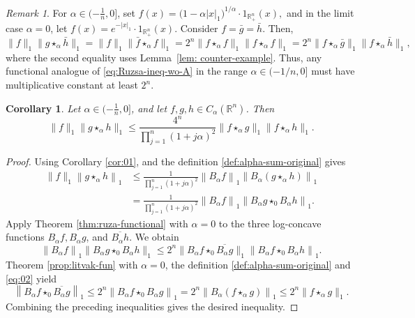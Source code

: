 \documentclass[11pt]{amsart}
\newcommand{\R}{{\mathbb R}}
\theoremstyle{plain}
\newtheorem{corollary}[theorem]{Corollary}
\theoremstyle{definition}
\theoremstyle{remark}
\newtheorem{remark}{Remark}
\begin{document}
\begin{remark}
For $\alpha\in(-\frac{1}{n},0]$, set $f(x)=\bigl(1-\alpha|x|_1\bigr)^{1/\alpha}\cdot {1}_{\mathbb{R}^n_+}(x),$
    and in the limit case $\alpha=0$, let
    \(
    f(x)=e^{-|x|_1} \cdot {1}_{\mathbb{R}^n_+}(x).
    \)
Consider  $f= \bar g = \bar h $. Then,
\[
\|f \|_1 \|g \star_\alpha \bar h\|_1 =\|f \|_1 \|\bar f \star_\alpha f \|_1 = 2^n \|f \star_\alpha f\|_1 \|f \star_\alpha f\|_1 = 2^n \|f \star_\alpha \bar g\|_1 \|f \star_\alpha \bar h\|_1,
\]
where the second equality uses Lemma~\ref{lem: counter-example}. Thus, any functional analogue of \eqref{eq:Ruzsa-ineq-wo-A} in the range \(\alpha\in(-1/n,0]\) must have multiplicative constant at least $2^n$.
\end{remark}


\begin{corollary} \label{cor:ruzvol1-func}
    Let $\alpha \in (-\frac{1}{n},0]$, and let $f,g,h  \in C_\alpha (\R^n)$. Then
    \[
        \|f\|_1 \|g \star_\alpha  h\|_1 \leq \frac{4^n}{\prod_{j=1}^n (1+j \alpha)^2} \|f \star_\alpha  g \|_1 \|f \star_\alpha  h \|_1.
    \]
\end{corollary}

\begin{proof}
    Using Corollary \ref{cor:01}, and the definition \eqref{def:alpha-sum-original} gives
$$
\begin{aligned}
\|f\|_1\left\|g \star_\alpha h\right\|_1 & \leq \frac{1}{\prod_{j=1}^n (1+j \alpha)^2}\left\|B_\alpha f\right\|_1\left\|B_\alpha\left(g \star_\alpha h\right)\right\|_1 \\
& =\frac{1}{\prod_{j=1}^n (1+j \alpha)^2}\left\|B_\alpha f\right\|_1\left\|B_\alpha g \star_0 B_\alpha h\right\|_1 .
\end{aligned}
$$
Apply Theorem \ref{thm:ruza-functional} with $\alpha=0$ to the three log-concave functions $B_\alpha f, B_\alpha g$, and $\overline{B_\alpha h}$. We obtain
$$
\left\|B_\alpha f\right\|_1\|B_\alpha g \star_0 B_\alpha h\|_1 \leq 2^n\|B_\alpha f \star_0 \overline{B_\alpha g}\|_1\left\|B_\alpha f \star_0 B_\alpha h\right\|_1 .
$$
Theorem \ref{prop:litvak-fun} with $\alpha=0$, the definition \eqref{def:alpha-sum-original} and \eqref{eq:02} yield
$$
\left\|B_\alpha f \star_0 \overline{B_\alpha g}\right\|_1 \leq 2^n\left\|B_\alpha f \star_0 B_\alpha g\right\|_1  = 2^n \left\|B_\alpha (f \star_\alpha g)\right\|_1 \leq 2^n\|f \star_\alpha g\|_1.
$$
Combining the preceding inequalities gives the desired inequality.
\end{proof}
\end{document}
